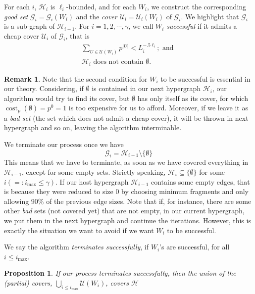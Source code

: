 \documentclass[12pt,oneside,reqno]{amsart}
\newtheorem{proposition}[theorem]{Proposition}
\theoremstyle{definition}
\newtheorem{remark}[theorem]{Remark}
\numberwithin{equation}{theorem}
\newcommand{\cG}{{\mathcal G}}
\newcommand{\cH}{{\mathcal H}}
\newcommand{\cU}{{\mathcal U}}
\begin{document}
For each $i$, $\cH_i$ is $\ell_i$-bounded, and for each $W_i$, we construct the corresponding \emph{good set} $\cG_i = \cG_i(W_i)$ and the \emph{cover} $\cU_i = \cU_i(W_i)$ of $\cG_i $. We highlight that $\cG_i$ is a sub-graph of $\cH_{i-1}$. For $i = 1, 2, \cdots, \gamma$, we call $W_i$ \emph{successful} if it admits a cheap cover $\cU_i $ of $\cG_i $, that is 
\begin{equation}\label{cheapcover}
\begin{gathered}
\sum_{U \in \mathcal{U}\left(W_{i}\right)} p^{|U|}<L_{i}^{-.5 \ell_{i}} ; \text { and } \\
\mathcal{H}_{i} \text { does not contain } \emptyset .
\end{gathered}
\end{equation}
\begin{remark}
Note that the second condition for $W_i$ to be successful is essential in our theory. Considering, if $\emptyset$ is contained in our next hypergraph $\mathcal{H}_{i}$, our algorithm would try to find its cover, but $\emptyset$ has only itself as its cover, for which $\operatorname{cost}_p(\emptyset) = p^{0} = 1$ is too expensive for us to afford. Moreover, if we leave it as a \emph{bad set} (the set which does not admit a cheap cover), it will be thrown in next hypergraph and so on, leaving the algorithm interminable. 
\end{remark}

We terminate our process once we have 
\[
\cG_i = \cH_{i-1}\setminus \{\emptyset\}
\]
This means that we have to terminate, as soon as we have covered everything in $\cH_{i-1}$, except for some empty sets. Strictly speaking, $\cH_i \subseteq \{\emptyset \}$ for some $i (=: i_\text{max} \leq \gamma)$. If our host hypergraph $\cH_{i-1}$ contains some empty edges, that is because they were reduced to size 0 by choosing minimum fragments and only allowing $90\%$ of the previous edge sizes. Note that if, for instance, there are some other \emph{bad} sets (not covered yet) that are not empty, in our current hypergraph, we put them in the next hypergraph and continue the iterations. However, this is exactly the situation we want to avoid if we want $W_i$ to be successful.

We say the algorithm \emph{terminates successfully}, if $W_i$'s are successful, for all $i \leq i_\text{max}$.
\begin{proposition} \label{termination}
If our process terminates successfully, then the union of the (partial) covers, $\bigcup_{i\leq i_\text{max}}\cU(W_i)$, covers $\cH$
\end{proposition}
\end{document}
